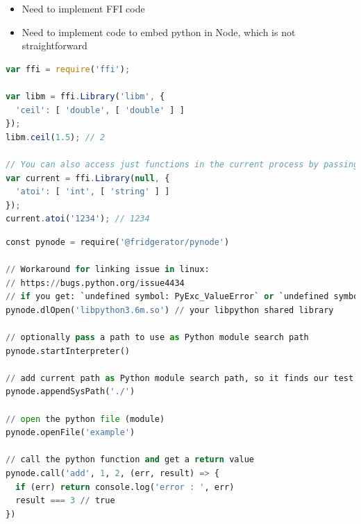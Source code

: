 \begin{itemize}
  \item Need to implement FFI code
  \item Need to implement code to embed python in Node, which is not straightforward
\end{itemize}

\begin{minipage}{\linewidth}

  \begin{lstlisting}[language=JavaScript, label={lst:node_ffi}, caption=Example of using \url{node-ffi} to call a C library \autocite{node-ffi}, breaklines=true]
var ffi = require('ffi');

var libm = ffi.Library('libm', {
  'ceil': [ 'double', [ 'double' ] ]
});
libm.ceil(1.5); // 2

// You can also access just functions in the current process by passing a null
var current = ffi.Library(null, {
  'atoi': [ 'int', [ 'string' ] ]
});
current.atoi('1234'); // 1234
\end{lstlisting}

\end{minipage}

\begin{minipage}{\linewidth}

  \begin{lstlisting}[language=Python, label={lst:pynode}, caption=Example of using \url{pynode} to embed python in JavaScript \autocite{pynode}, breaklines=true]
const pynode = require('@fridgerator/pynode')

// Workaround for linking issue in linux:
// https://bugs.python.org/issue4434
// if you get: `undefined symbol: PyExc_ValueError` or `undefined symbol: PyExc_SystemError`
pynode.dlOpen('libpython3.6m.so') // your libpython shared library

// optionally pass a path to use as Python module search path
pynode.startInterpreter()

// add current path as Python module search path, so it finds our test.py
pynode.appendSysPath('./')

// open the python file (module)
pynode.openFile('example')

// call the python function and get a return value
pynode.call('add', 1, 2, (err, result) => {
  if (err) return console.log('error : ', err)
  result === 3 // true
})
\end{lstlisting}

\end{minipage}

